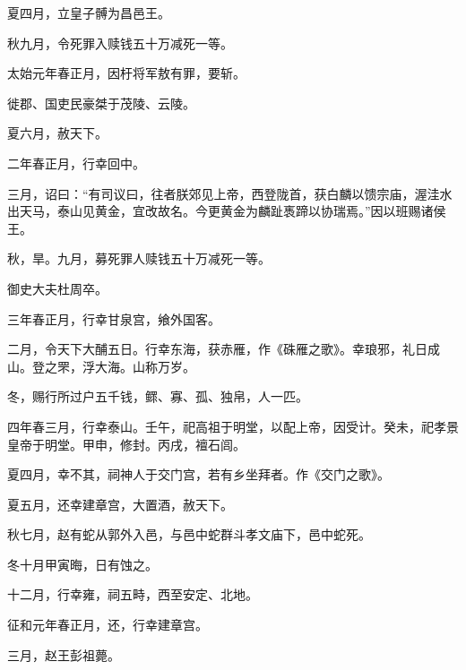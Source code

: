 \documentclass[12pt,UTF8]{ctexbook}
\begin{document}
夏四月，立皇子髆为昌邑王。



秋九月，令死罪入赎钱五十万减死一等。



太始元年春正月，因杅将军敖有罪，要斩。



徙郡、国吏民豪桀于茂陵、云陵。



夏六月，赦天下。



二年春正月，行幸回中。



三月，诏曰：“有司议曰，往者朕郊见上帝，西登陇首，获白麟以馈宗庙，渥洼水出天马，泰山见黄金，宜改故名。今更黄金为麟趾褭蹄以协瑞焉。”因以班赐诸侯王。



秋，旱。九月，募死罪人赎钱五十万减死一等。



御史大夫杜周卒。



三年春正月，行幸甘泉宫，飨外国客。



二月，令天下大酺五日。行幸东海，获赤雁，作《硃雁之歌》。幸琅邪，礼日成山。登之罘，浮大海。山称万岁。



冬，赐行所过户五千钱，鳏、寡、孤、独帛，人一匹。



四年春三月，行幸泰山。壬午，祀高祖于明堂，以配上帝，因受计。癸未，祀孝景皇帝于明堂。甲申，修封。丙戌，襢石闾。



夏四月，幸不其，祠神人于交门宫，若有乡坐拜者。作《交门之歌》。



夏五月，还幸建章宫，大置酒，赦天下。



秋七月，赵有蛇从郭外入邑，与邑中蛇群斗孝文庙下，邑中蛇死。



冬十月甲寅晦，日有蚀之。



十二月，行幸雍，祠五畤，西至安定、北地。



征和元年春正月，还，行幸建章宫。



三月，赵王彭祖薨。
\end{document}
